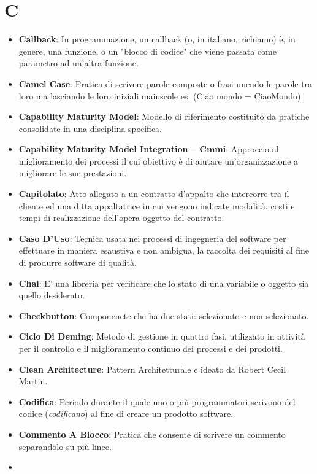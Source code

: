 \section*{C}
\begin{itemize}
	\item
	\textbf{Callback}: In programmazione, un callback (o, in italiano, richiamo) è, in genere, una funzione, o un "blocco di codice" che viene passata come parametro ad un'altra funzione.
	\item
	\textbf{Camel Case}: Pratica di scrivere parole composte o frasi unendo le parole tra loro ma lasciando le loro iniziali maiuscole es: (Ciao mondo = CiaoMondo).
	\item
	\textbf{Capability Maturity Model}: Modello di riferimento costituito da pratiche consolidate in una disciplina specifica.
	\item
	\textbf{Capability Maturity Model Integration -- Cmmi}: Approccio al miglioramento dei processi il cui obiettivo è di aiutare un'organizzazione a migliorare le sue prestazioni.
	\item
	\textbf{Capitolato}: Atto allegato a un contratto d'appalto che intercorre tra il cliente ed una ditta appaltatrice in cui vengono indicate modalità, costi e tempi di realizzazione dell'opera oggetto del contratto.
	\item
	\textbf{Caso D'Uso}: Tecnica usata nei processi di ingegneria del software per effettuare in maniera esaustiva e non ambigua, la raccolta dei requisiti al fine di produrre software di qualità.
	\item
	\textbf{Chai}: E' una libreria per verificare che lo stato di una variabile o oggetto sia quello desiderato.
	\item
	\textbf{Checkbutton}: Componenete che ha due stati: selezionato e non selezionato.
	\item
	\textbf{Ciclo Di Deming}: Metodo di gestione in quattro fasi, utilizzato in attività per il controllo e il miglioramento continuo dei processi e dei prodotti.
	\item
	\textbf{Clean Architecture}: Pattern Architetturale e ideato da Robert Cecil Martin.
	\item
	\textbf{Codifica}: Periodo durante il quale uno o più programmatori scrivono del codice (\textit{codificano}) al fine di creare un prodotto software.
	\item
	\textbf{Commento A Blocco}: Pratica che consente di scrivere un commento separandolo su più linee.
	\item

\end{itemize}
